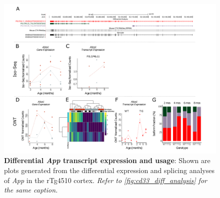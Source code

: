 \begin{landscape}
	\begin{figure}[htp]
		\begin{center}
			\includegraphics[page=5,trim={0 0.5cm 0 1.5cm},scale =0.85]{Figures/TargetGene_DifferentialAnalysis.pdf}
		\end{center}
		\captionsetup{width=1.5\textwidth}
		\caption[Differential \textit{App} transcript expression and usage]%
		{\textbf{Differential \textit{App} transcript expression and usage}: Shown are plots generated from the differential expression and splicing analyses of \textit{App} in the rTg4510 cortex. \textit{Refer to \cref{fig:cd33_diff_analysis} for the same caption.}}   
		\label{fig:App_diff_analysis}
	\end{figure}
\end{landscape}

